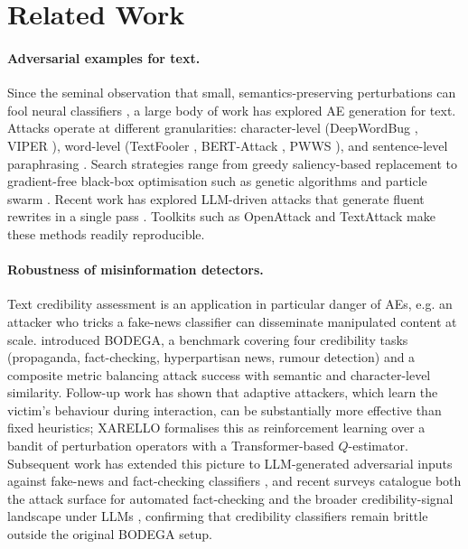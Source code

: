 \documentclass[11pt]{article}
\begin{document}
\section{Related Work}
\label{sec:related-work}
\paragraph{Adversarial examples for text.}
Since the seminal observation that small, semantics-preserving perturbations can fool neural classifiers \citep{Goodfellow2015, Szegedy2014}, a large body of work has explored AE generation for text. Attacks operate at different granularities: character-level (DeepWordBug \citep{Gao2018}, VIPER \citep{Eger2019}), word-level (TextFooler \citep{Jin2020}, BERT-Attack \citep{Li2020bert}, PWWS \citep{Ren2019}), and sentence-level paraphrasing \citep{Iyyer2018}. Search strategies range from greedy saliency-based replacement to gradient-free black-box optimisation such as genetic algorithms \citep{Alzantot2018} and particle swarm \citep{Zang2020}. Recent work has explored LLM-driven attacks that generate fluent rewrites in a single pass \citep{Moraffah2024purification, ZouUniversalLLM2023}. Toolkits such as OpenAttack \citep{Zeng2021} and TextAttack \citep{Morris2020} make these methods readily reproducible.


\paragraph{Robustness of misinformation detectors.}
Text credibility assessment \citep{Srba2026credibility} is an application in particular danger of AEs, e.g. an attacker who tricks a fake-news classifier can disseminate manipulated content at scale. \citet{verifying_robustness} introduced BODEGA, a benchmark covering four credibility tasks (propaganda, fact-checking, hyperpartisan news, rumour detection) and a composite metric balancing attack success with semantic and character-level similarity. Follow-up work has shown that adaptive attackers, which learn the victim's behaviour during interaction, can be substantially more effective than fixed heuristics; XARELLO \citep{przybyla-etal-2024-know} formalises this as reinforcement learning over a bandit of perturbation operators with a Transformer-based $Q$-estimator. Subsequent work has extended this picture to LLM-generated adversarial inputs against fake-news and fact-checking classifiers \citep{Bethany2025camouflage, Aldahoul2025multiagent, Przybyla2025LLMattack}, and recent surveys catalogue both the attack surface for automated fact-checking \citep{Liu2025fcsurvey} and the broader credibility-signal landscape under LLMs \citep{Srba2026credibility}, confirming that credibility classifiers remain brittle outside the original BODEGA setup.
\end{document}

